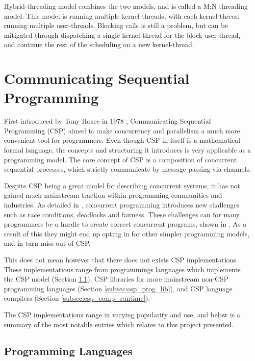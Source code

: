 Hybrid-threading model combines the two models, and is called a M:N threading model. This model is running multiple kernel-threads, with each kernel-thread running multiple user-threads. Blocking calls is still a problem, but can be mitigated through dispatching a single kernel-thread for the block user-thread, and continue the rest of the scheduling on a new kernel-thread. 


\section{Communicating Sequential Programming}
\label{sec:csp}

First introduced by Tony Hoare in 1978 \citep{csp}, Communicating Sequential Programming (CSP) aimed to make concurrency and parallelism a much more convenient tool for programmers. Even though CSP in itself is a mathematical formal language, the concepts and structuring it introduces is very applicable as a programming model. The core concept of CSP is a composition of concurrent sequential processes, which strictly communicate by message passing via channels.

Despite CSP being a great model for describing concurrent systems, it has not gained much mainstream traction within programming communities and industries. As detailed in \citet{benari2006}, concurrent programming introduces new challenges such as race conditions, deadlocks and fairness. These challenges can for many programmers be a hurdle to create correct concurrent programs, shown in \citet{ousterhour1996}. As a result of this they might end up opting in for other simpler programming models, and in turn miss out of CSP. 

This does not mean however that there does not exists CSP implementations. These implementations range from programmings languages which implements the CSP model (Section \ref{subsec:csp_prog_lang}), CSP libraries for more mainstream non-CSP programming languages (Section \ref{subsec:csp_prog_lib}), and CSP language compilers (Section \ref{subsec:csp_comp_runtime}).

The CSP implementations range in varying popularity and use, and below is a summary of the most notable entries which relates to this project presented.


\subsection{Programming Languages}
\label{subsec:csp_prog_lang}

